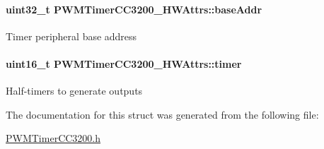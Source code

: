 \paragraph[{base\-Addr}]{\setlength{\rightskip}{0pt plus 5cm}uint32\-\_\-t P\-W\-M\-Timer\-C\-C3200\-\_\-\-H\-W\-Attrs\-::base\-Addr}\label{struct_p_w_m_timer_c_c3200___h_w_attrs_a2cc366b46e3f710f761ad990afa1aea0}
Timer peripheral base address 
\paragraph[{timer}]{\setlength{\rightskip}{0pt plus 5cm}uint16\-\_\-t P\-W\-M\-Timer\-C\-C3200\-\_\-\-H\-W\-Attrs\-::timer}\label{struct_p_w_m_timer_c_c3200___h_w_attrs_aa25fe5589d4a5c924759293c334fb40d}
Half-\/timers to generate outputs 

The documentation for this struct was generated from the following file\-:\begin{DoxyCompactItemize}
\item 
\hyperlink{_p_w_m_timer_c_c3200_8h}{P\-W\-M\-Timer\-C\-C3200.\-h}\end{DoxyCompactItemize}
